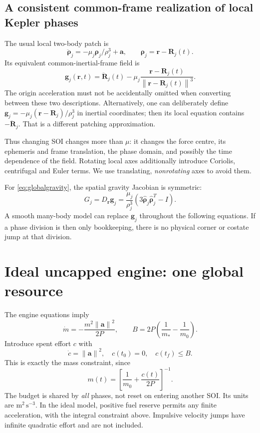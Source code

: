 \documentclass[journal, a4paper]{IEEEtran}
\newcommand{\norm}[1]{\left\lVert#1\right\rVert}
\begin{document}
\subsection{A consistent common-frame realization of local Kepler phases}
The usual local two-body patch is
\begin{equation}
 \ddot{\boldsymbol\rho}_j=-\mu_j\boldsymbol\rho_j/\rho_j^3+\mathbf a,
 \qquad \boldsymbol\rho_j=\mathbf r-\mathbf R_j(t).
 \label{eq:localgravity}
\end{equation}
Its equivalent common-inertial-frame field is
\begin{equation}
 \boxed{\mathbf g_j(\mathbf r,t)=\ddot{\mathbf R}_j(t)
       -\mu_j\frac{\mathbf r-\mathbf R_j(t)}{\norm{\mathbf r-\mathbf R_j(t)}^3}.}
 \label{eq:globalgravity}
\end{equation}
The origin acceleration must not be accidentally omitted when converting between these two descriptions. Alternatively, one can deliberately define $\mathbf g_j=-\mu_j(\mathbf r-\mathbf R_j)/\rho_j^3$ in inertial coordinates; then its local equation contains $-\ddot{\mathbf R}_j$. That is a different patching approximation.

Thus changing SOI changes more than $\mu$: it changes the force centre, its ephemeris and frame translation, the phase domain, and possibly the time dependence of the field. Rotating local axes additionally introduce Coriolis, centrifugal and Euler terms. We use translating, \emph{nonrotating} axes to avoid them.

For \eqref{eq:globalgravity}, the spatial gravity Jacobian is symmetric:
\begin{equation}
 G_j=D_{\mathbf r}\mathbf g_j=
 \frac{\mu_j}{\rho_j^3}(3\hat{\boldsymbol\rho}_j\hat{\boldsymbol\rho}_j^T-I).
 \label{eq:gravityjac}
\end{equation}
A smooth many-body model can replace $\mathbf g_j$ throughout the following equations. If a phase division is then only bookkeeping, there is no physical corner or costate jump at that division.

\section{Ideal uncapped engine: one global resource}
The engine equations imply
\begin{equation}
 \dot m=-\frac{m^2\norm{\mathbf a}^2}{2P},\qquad
 B=2P\left(\frac1{m_*}-\frac1{m_0}\right).
\end{equation}
Introduce spent effort $c$ with
\begin{equation}
 \dot c=\norm{\mathbf a}^2,\quad c(t_0)=0,\quad c(t_f)\le B.
 \label{eq:effort}
\end{equation}
This is exactly the mass constraint, since
\begin{equation}
 m(t)=\left[\frac1{m_0}+\frac{c(t)}{2P}\right]^{-1}.
 \label{eq:massrecover}
\end{equation}
The budget is shared by \emph{all} phases, not reset on entering another SOI. Its units are $\mathrm{m^2\,s^{-3}}$. In the ideal model, positive fuel reserve permits any finite acceleration, with the integral constraint above. Impulsive velocity jumps have infinite quadratic effort and are not included.
\end{document}
